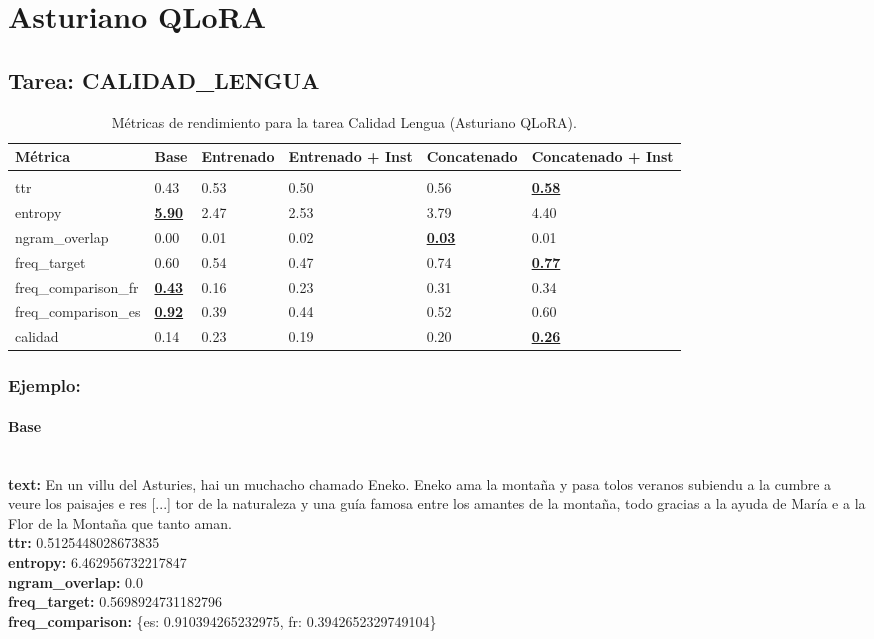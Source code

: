 \section{Asturiano QLoRA}

\subsection{Tarea: CALIDAD\_LENGUA}\label{tarea-calidad_lengua}
\begin{longtable}[]{@{}llllll@{}}
\toprule\noalign{}
Métrica & Base & Entrenado & Entrenado + Inst & Concatenado & Concatenado + Inst \\
\midrule\noalign{}
\endhead
\bottomrule\noalign{}
\caption{Métricas de rendimiento para la tarea Calidad Lengua (Asturiano QLoRA).}
\label{tab:metricas_calidad_lengua_Asturiano QLoRA}}\\
\endlastfoot
ttr & 0.43 & 0.53 & 0.50 & 0.56 & \textbf{\underline{0.58}} \\
entropy & \textbf{\underline{5.90}} & 2.47 & 2.53 & 3.79 & 4.40 \\
ngram\_overlap & 0.00 & 0.01 & 0.02 & \textbf{\underline{0.03}} & 0.01 \\
freq\_target & 0.60 & 0.54 & 0.47 & 0.74 & \textbf{\underline{0.77}} \\
freq\_comparison\_fr & \textbf{\underline{0.43}} & 0.16 & 0.23 & 0.31 & 0.34 \\
freq\_comparison\_es & \textbf{\underline{0.92}} & 0.39 & 0.44 & 0.52 & 0.60 \\
calidad & 0.14 & 0.23 & 0.19 & 0.20 & \textbf{\underline{0.26}} \\
\end{longtable}

\subsubsection{Ejemplo:}

\paragraph{Base}~\\
\textbf{text:} En un villu del Asturies, hai un muchacho chamado Eneko. Eneko ama la montaña y pasa tolos veranos subiendu a la cumbre a veure los paisajes e res [...] tor de la naturaleza y una guía famosa entre los amantes de la montaña, todo gracias a la ayuda de María e a la Flor de la Montaña que tanto aman.\\
\textbf{ttr:} 0.5125448028673835\\
\textbf{entropy:} 6.462956732217847\\
\textbf{ngram\_overlap:} 0.0\\
\textbf{freq\_target:} 0.5698924731182796\\
\textbf{freq\_comparison:} \{\textquotesingle{}es\textquotesingle{}: 0.910394265232975, \textquotesingle{}fr\textquotesingle{}: 0.3942652329749104\}\\

